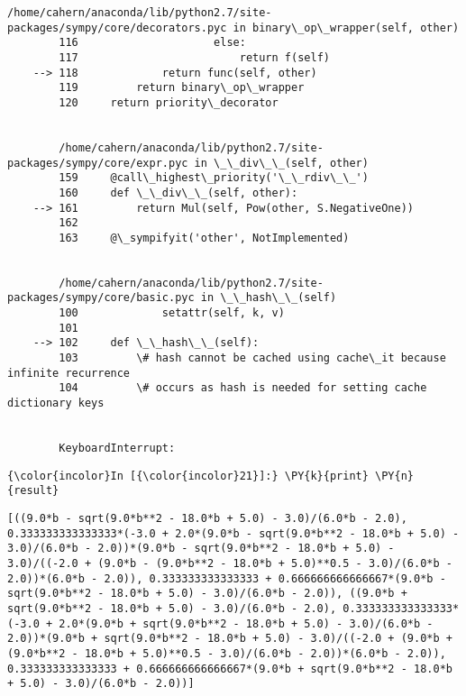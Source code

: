 \begin{Verbatim}[commandchars=\\\{\}]
        /home/cahern/anaconda/lib/python2.7/site-packages/sympy/core/decorators.pyc in binary\_op\_wrapper(self, other)
        116                     else:
        117                         return f(self)
    --> 118             return func(self, other)
        119         return binary\_op\_wrapper
        120     return priority\_decorator


        /home/cahern/anaconda/lib/python2.7/site-packages/sympy/core/expr.pyc in \_\_div\_\_(self, other)
        159     @call\_highest\_priority('\_\_rdiv\_\_')
        160     def \_\_div\_\_(self, other):
    --> 161         return Mul(self, Pow(other, S.NegativeOne))
        162 
        163     @\_sympifyit('other', NotImplemented)


        /home/cahern/anaconda/lib/python2.7/site-packages/sympy/core/basic.pyc in \_\_hash\_\_(self)
        100             setattr(self, k, v)
        101 
    --> 102     def \_\_hash\_\_(self):
        103         \# hash cannot be cached using cache\_it because infinite recurrence
        104         \# occurs as hash is needed for setting cache dictionary keys


        KeyboardInterrupt: 

    \end{Verbatim}

    \begin{Verbatim}[commandchars=\\\{\}]
{\color{incolor}In [{\color{incolor}21}]:} \PY{k}{print} \PY{n}{result}
\end{Verbatim}

    \begin{Verbatim}[commandchars=\\\{\}]
[((9.0*b - sqrt(9.0*b**2 - 18.0*b + 5.0) - 3.0)/(6.0*b - 2.0), 0.333333333333333*(-3.0 + 2.0*(9.0*b - sqrt(9.0*b**2 - 18.0*b + 5.0) - 3.0)/(6.0*b - 2.0))*(9.0*b - sqrt(9.0*b**2 - 18.0*b + 5.0) - 3.0)/((-2.0 + (9.0*b - (9.0*b**2 - 18.0*b + 5.0)**0.5 - 3.0)/(6.0*b - 2.0))*(6.0*b - 2.0)), 0.333333333333333 + 0.666666666666667*(9.0*b - sqrt(9.0*b**2 - 18.0*b + 5.0) - 3.0)/(6.0*b - 2.0)), ((9.0*b + sqrt(9.0*b**2 - 18.0*b + 5.0) - 3.0)/(6.0*b - 2.0), 0.333333333333333*(-3.0 + 2.0*(9.0*b + sqrt(9.0*b**2 - 18.0*b + 5.0) - 3.0)/(6.0*b - 2.0))*(9.0*b + sqrt(9.0*b**2 - 18.0*b + 5.0) - 3.0)/((-2.0 + (9.0*b + (9.0*b**2 - 18.0*b + 5.0)**0.5 - 3.0)/(6.0*b - 2.0))*(6.0*b - 2.0)), 0.333333333333333 + 0.666666666666667*(9.0*b + sqrt(9.0*b**2 - 18.0*b + 5.0) - 3.0)/(6.0*b - 2.0))]
    \end{Verbatim}

